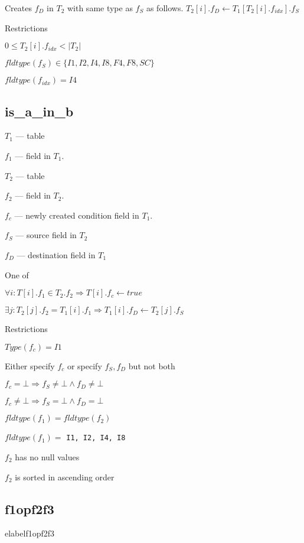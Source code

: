 Creates \(f_D\) in \(T_2\) with same type as \(f_S\) as follows.
\(T_2[i].f_D \leftarrow T_1[T_2[i].f_{idx}].f_S\)

Restrictions
\be
\item \(0 \leq T_2[i].f_{idx} < |T_2|\)
\item \(fldtype(f_S) \in \{ I1, I2, I4, I8, F4, F8, SC\}\)
\item \(fldtype(f_{idx}) = I4\)
\ee


\subsection{is\_a\_in\_b}
\label{is_a_in_b}

\be
\item \(T_1\) --- table
\item \(f_1\) --- field in \(T_1\). 
\item \(T_2\) --- table
\item \(f_2\) --- field in \(T_2\). 
\item \(f_c\) --- newly created condition field in \(T_1\). 
\item \(f_S\) --- source field in \(T_2\)
\item \(f_D\) --- destination field in \(T_1\)
\ee

One of 
\be
\item 
\(\forall i: T[i].f_1 \in T_2.f_2 \Rightarrow T[i].f_c \leftarrow true\)
\item \(\exists j: T_2[j].f_2 = T_1[i].f_1 \Rightarrow T_1[i].f_D
\leftarrow T_2[j].f_S\)
\ee

Restrictions
\be
\item \(Type(f_c) = I1\)
\item Either specify \(f_c\) or specify \(f_S, f_D\) but not both
\be
\item \(f_c = \bot \Rightarrow f_S \neq \bot \wedge f_D \neq \bot\)
\item \(f_c \neq \bot \Rightarrow f_S = \bot \wedge f_D = \bot\)
\ee
\item \(fldtype(f_1) = fldtype(f_2)\)
\item \(fldtype(f_1) = \) {\tt I1, I2, I4, I8}
\item \(f_2\) has no null values
\item \(f_2\) is sorted in ascending order
\ee

\subsection{f1opf2f3}
elabel{f1opf2f3}

